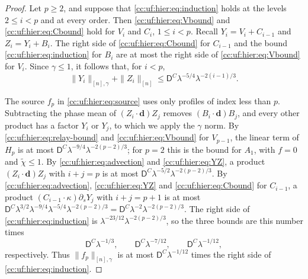 \begin{proof}
Let $p\ge2$, and suppose that \eqref{cc:uf:hier:eq:induction} holds at
the levels $2\le i<p$ and at every order. Then
\eqref{cc:uf:hier:eq:Vbound} and \eqref{cc:uf:hier:eq:Cbound} hold for
$V_i$ and $C_i$, $1\le i<p$. Recall $Y_i=V_i+C_{i-1}$ and $Z_i=Y_i+B_i$.
The right side of \eqref{cc:uf:hier:eq:Cbound} for $C_{i-1}$ and the
bound \eqref{cc:uf:hier:eq:induction} for $B_i$ are at most the right
side of \eqref{cc:uf:hier:eq:Vbound} for $V_i$. Since
$\gamma\le1$, it follows that, for $i<p$,
\begin{equation}\label{cc:uf:hier:eq:YZ}
 \|Y_i\|_{[n],\gamma}+\|Z_i\|_{[n]}
 \le\mathsf D^C\lambda^{-5/4}\lambda^{-2(i-1)/3}.
\end{equation}

The source $f_p$ in \eqref{cc:uf:hier:eq:source} uses only profiles of
index less than $p$. Subtracting the phase mean of $(Z_i\cdot\mathbf d)Z_j$
removes $(B_i\cdot\mathbf d)B_j$, and every other product has a
factor $Y_i$ or $Y_j$, to which we apply the $\gamma$ norm.
By \eqref{cc:uf:hier:eq:relay-bound} and \eqref{cc:uf:hier:eq:Vbound}
for $V_{p-1}$, the linear term of $H_p$ is at most
$\mathsf D^C\lambda^{-9/4}\lambda^{-2(p-2)/3}$; for $p=2$
this is the bound for $A_1$, with $f=0$ and $\widetilde\chi\le1$. By
\eqref{cc:uf:hier:eq:advection} and \eqref{cc:uf:hier:eq:YZ}, a product
$(Z_i\cdot\mathbf d)Z_j$ with $i+j=p$ is at most
$\mathsf D^C\lambda^{-5/2}\lambda^{-2(p-2)/3}$. By
\eqref{cc:uf:hier:eq:advection}, \eqref{cc:uf:hier:eq:YZ} and
\eqref{cc:uf:hier:eq:Cbound} for $C_{i-1}$, a product
$(C_{i-1}\cdot\kappa)\partial_sY_j$ with $i+j=p+1$ is at most
$\mathsf D^C\lambda^{3/2}\lambda^{-9/4}\lambda^{-5/4}\lambda^{-2(p-2)/3}
=\mathsf D^C\lambda^{-2}\lambda^{-2(p-2)/3}$. The right side of
\eqref{cc:uf:hier:eq:induction} is
$\lambda^{-23/12}\lambda^{-2(p-2)/3}$, so the three bounds are this
number times
\[
 \mathsf D^C\lambda^{-1/3},\qquad
 \mathsf D^C\lambda^{-7/12},\qquad
 \mathsf D^C\lambda^{-1/12},
\]
respectively. Thus $\|f_p\|_{[n],\gamma}$ is at most
$\mathsf D^C\lambda^{-1/12}$ times the right side of
\eqref{cc:uf:hier:eq:induction}.


\end{proof}
